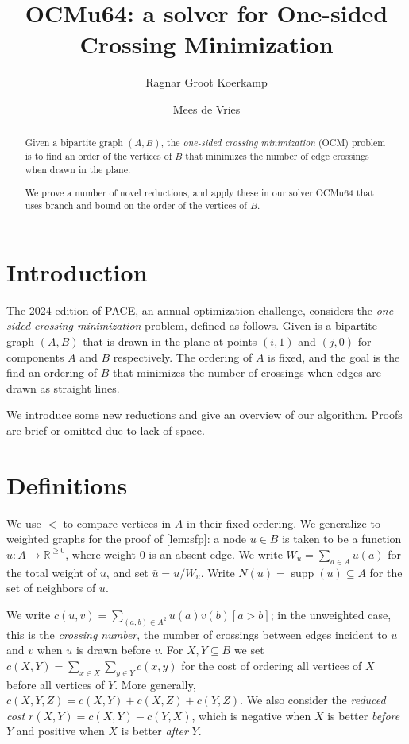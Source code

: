 \documentclass[a4paper,UKenglish,cleveref, autoref, thm-restate]{lipics-v2021}
\title{OCMu64: a solver for One-sided Crossing Minimization} %
\author{Ragnar {Groot Koerkamp}}{ETH Zurich, Switzerland}{ragnar.grootkoerkamp@gmail.com}{https://orcid.org/0000-0002-2091-1237}{}%
\author{Mees de Vries}{Unaffiliated, Netherlands}{meesdevries@protonmail.com}{}{}
\DeclareMathOperator{\supp}{supp}
\begin{document}
\maketitle

\begin{abstract}
  Given a bipartite graph $(A,B)$, the \emph{one-sided crossing minimization} (OCM) problem is to find an order of the
  vertices of $B$ that minimizes the number
  of edge crossings when drawn in the plane.

  We prove a number of novel reductions, and apply these in our solver OCMu64 that
  uses branch-and-bound on the order of the vertices of $B$.
\end{abstract}

\section{Introduction}

The 2024 edition of PACE, an annual optimization challenge, considers the
\emph{one-sided crossing minimization} problem, defined as follows.
Given is a bipartite graph $(A, B)$ that is drawn in the plane at points
$(i, 1)$ and $(j,0)$ for components $A$ and $B$ respectively. The ordering of $A$
is fixed, and the goal is the find an ordering of $B$ that minimizes the number of
crossings when edges are drawn as straight lines.

We introduce some new reductions and give an overview of our algorithm. Proofs are brief or
omitted due to lack of space.

\section{Definitions}
We use $<$ to compare vertices in $A$ in their fixed ordering. We generalize to weighted graphs
for the proof of \ref{lem:sfp}: a node $u \in B$ is taken to be a function $u: A \to \mathbb
R^{\geq 0}$, where weight 0 is an absent edge. We write $W_u = \sum_{a \in A}u(a)$ for the
total weight of $u$, and set $\bar u = u/W_u$. Write $N(u) = \supp(u) \subseteq A$ for the
set of neighbors of $u$.

We write $c(u, v) = \sum_{(a, b) \in A^2}
u(a)v(b)[a > b]$; in the unweighted case, this is the \emph{crossing number}, the number of
crossings between edges incident to $u$ and $v$ when $u$ is drawn before $v$.  For
$X,Y\subseteq B$ we set $c(X,Y) = \sum_{x\in X}\sum_{y\in Y} c(x,y)$ for the cost of ordering
all vertices of $X$ before all vertices of $Y$. More generally, $c(X,Y,Z) = c(X, Y) + c(X, Z) +
c(Y, Z)$. We also consider the \emph{reduced cost} $r(X,Y) = c(X, Y) - c(Y, X)$, which is
negative when $X$ is better \emph{before} $Y$ and positive when $X$ is better \emph{after} $Y$.
\end{document}
